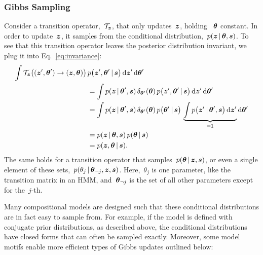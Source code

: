 \subsubsection{Gibbs Sampling}
Consider a transition operator,~$\mathcal{T}_{\boldsymbol{z}}$, that only updates~$\boldsymbol{z}$,
holding ~$\boldsymbol{\theta}$ constant. In order to update~$\boldsymbol{z}$, it samples from
the conditional distribution,~$p(\boldsymbol{z} \,|\, \boldsymbol{\theta}, \boldsymbol{s})$. To see
that this transition operator leaves the posterior distribution
invariant, we plug it into Eq.~\ref{eq:invariance}:
\begin{align*}
  \int \mathcal{T}_{\boldsymbol{z}} \big((\boldsymbol{z}', \boldsymbol{\theta}') \to (\boldsymbol{z}, \boldsymbol{\theta}) \big) \, 
    &p \big(\boldsymbol{z}', \boldsymbol{\theta}' \,|\, \boldsymbol{s} \big) \, 
    \mathrm{d}\boldsymbol{z}' \, \mathrm{d}\boldsymbol{\theta}' \\
  &= \int p(\boldsymbol{z} \,|\, \boldsymbol{\theta}', \boldsymbol{s}) \, \delta_{\boldsymbol{\theta}'}(\boldsymbol{\theta}) \,
    p \big(\boldsymbol{z}', \boldsymbol{\theta}' \,|\, \boldsymbol{s} \big) \, 
    \mathrm{d}\boldsymbol{z}' \, \mathrm{d}\boldsymbol{\theta}' \\
  &= 
  \int p(\boldsymbol{z} \,|\, \boldsymbol{\theta}', \boldsymbol{s}) \, \delta_{\boldsymbol{\theta}'}(\boldsymbol{\theta}) \,
    p \big(\boldsymbol{\theta}' \,|\, \boldsymbol{s} \big) \,
     \underbrace{\int
    p \big(\boldsymbol{z}' \,|\, \boldsymbol{\theta}', \boldsymbol{s} \big) \, 
    \mathrm{d}\boldsymbol{z}'}_{=1}  \mathrm{d}\boldsymbol{\theta}' \\
  &= p(\boldsymbol{z} \,|\, \boldsymbol{\theta}, \boldsymbol{s}) \, p(\boldsymbol{\theta} \,|\, \boldsymbol{s}) \\
  &= p(\boldsymbol{z}, \boldsymbol{\theta} \,|\, \boldsymbol{s}).
\end{align*}
The same holds for a transition operator that
samples~${p(\boldsymbol{\theta} \,|\, \boldsymbol{z}, \boldsymbol{s})}$, or even a single element of these
sets,~${p(\theta_j \,|\, \boldsymbol{\theta}_{\neg j}, \boldsymbol{z}, \boldsymbol{s})}$.
Here,~$\theta_j$ is one parameter, like the transition matrix in an
HMM, and~$\boldsymbol{\theta}_{\neg j}$ is the set of all other parameters except
for the~$j$-th.

Many compositional models are designed such that these conditional
distributions are in fact easy to sample from. For example, if the
model is defined with conjugate prior distributions, as described
above, the conditional distributions have closed forms that can
often be sampled exactly. Moreover, some model motifs enable more
efficient types of Gibbs updates outlined below:

